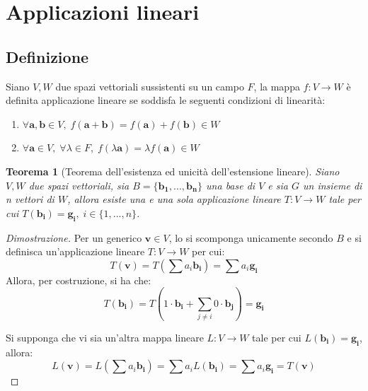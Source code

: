 \documentclass{article}
\newtheorem{theorem}{Teorema}
\begin{document}
\setlength{\parindent}{0pt}

\section{Applicazioni lineari}
\subsection{Definizione}
    Siano $V, W$ due spazi vettoriali sussistenti su un campo $F$, la mappa $f: V \rightarrow W$ è definita applicazione lineare se soddisfa le seguenti condizioni di linearità:
    \begin{enumerate}[label=(\arabic*)]
        \item $\forall \mathbf{a}, \mathbf{b} \in V, \; f(\mathbf{a} + \mathbf{b}) = f(\mathbf{a}) + f(\mathbf{b}) \in W$ 
        \item $\forall \mathbf{a} \in V, \; \forall \lambda \in F, \; f(\lambda \mathbf{a}) = \lambda f(\mathbf{a}) \in W$ 
    \end{enumerate}

    \vspace{10pt}
    \begin{theorem}[Teorema dell'esistenza ed unicità dell'estensione lineare]
       Siano $V, W$ due spazi vettoriali, sia $B = \{\mathbf{b_1}, ..., \mathbf{b_n}\}$ una base di $V$ e sia $G$ un insieme di n vettori di $W$, allora esiste una e una sola
       applicazione lineare $T : V \rightarrow W$ tale per cui $T(\mathbf{b_i}) = \mathbf{g_i}, \; i \in \{1, ..., n\}$.
    \end{theorem}

    \begin{proof}[Dimostrazione]
        Per un generico $\mathbf{v} \in V$, lo si scomponga unicamente secondo $B$ e si definisca un'applicazione lineare $T: V \rightarrow W$ per cui:
        \[
            T(\mathbf{v}) = T(\sum a_i \mathbf{b_i}) = \sum a_i \mathbf{g_i}
        \]
        Allora, per costruzione, si ha che:
        \[
           T(\mathbf{b_i}) = T(1 \cdot \mathbf{b_i} + \sum_{j \neq i} 0 \cdot \mathbf{b_j}) = \mathbf{g_i}
        \]

        Si supponga che vi sia un'altra mappa lineare $L : V \rightarrow W$ tale per cui $L(\mathbf{b_i}) = \mathbf{g_i}$, allora:
        \[
            L(\mathbf{v}) = L(\sum a_i \mathbf{b_i}) = \sum a_i L(\mathbf{b_i}) = \sum a_i \mathbf{g_i} = T(\mathbf{v})
        \]
    \end{proof}
\end{document}
